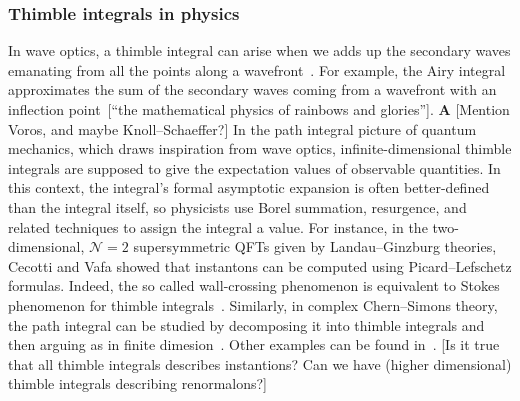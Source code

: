 \documentclass{article}
\theoremstyle{definition}
\theoremstyle{plain}
\newenvironment{todo}{\color{Coral}}{\color{black}}
\newenvironment{revised}{\color{DarkBlue}}{\color{black}}
\begin{document}
\subsubsection{Thimble integrals in physics}
\begin{revised}In wave optics, a thimble integral can arise when we adds up the secondary waves emanating from all the points along a wavefront~\cite{Fenyes-ihes-lecture}. For example, the Airy integral approximates the sum of the secondary waves coming from a wavefront with an inflection point~\begin{todo}[``the mathematical physics of rainbows and glories'']\end{todo}.\end{revised} \begin{todo}\textbf{A} [Mention Voros, and maybe Knoll--Schaeffer?]\end{todo} \begin{revised}In the path integral picture of quantum mechanics, which draws inspiration from wave optics,\end{revised} infinite-dimensional \begin{revised}thimble integrals\end{revised} are supposed to give the expectation values of observable quantities. In this context, \begin{revised}the integral's formal asymptotic expansion is often better-defined than the integral itself, so physicists use Borel summation, resurgence, and related techniques to assign the integral a value.\end{revised}
For instance, in the two-dimensional, $\mathcal{N}=2$ supersymmetric QFTs given by Landau--Ginzburg theories, Cecotti and Vafa showed that instantons can be computed using Picard--Lefschetz formulas. Indeed, the so called wall-crossing phenomenon is equivalent to Stokes phenomenon for thimble integrals~\cite{CV91}.
Similarly, in complex Chern--Simons theory, the path integral can be studied by decomposing it into thimble integrals and then arguing as in finite dimesion~\cite{gukov-marino-purtrov-resurgence,Witten}. Other examples can be found in~\cite{costin_kruskal,Garoufalidis--CS,GTM--CS,GGM,dunne-unsal2,dunne-unsal,Fauvet_Menous_Queva,Tanizaki:2014tua,Berry_Howls,Berry1991,Howls97,Howls,pham1988resurgence,Unsal--resurgence-gauge}.
\begin{todo}[Is it true that all thimble integrals describes instantions? Can we have (higher dimensional) thimble integrals describing renormalons?]\end{todo}
%
\end{document}
